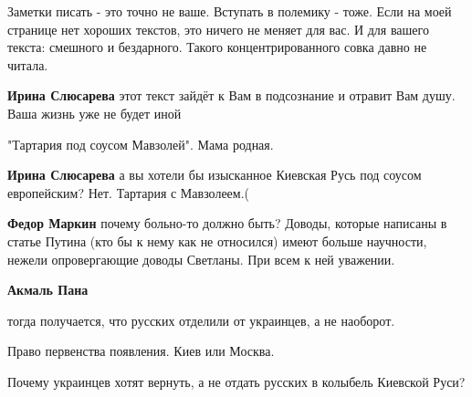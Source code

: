 \begin{itemize}
\begin{itemize}
Заметки писать - это точно не ваше. Вступать в полемику - тоже. Если на моей
странице нет хороших текстов, это ничего не меняет для вас. И для вашего
текста: смешного и бездарного. Такого концентрированного совка давно не читала.


 
\textbf{Ирина Слюсарева} этот текст зайдёт к Вам в подсознание и отравит Вам душу. Ваша жизнь уже не будет иной

 
"Тартария под соусом Мавзолей". Мама родная.

 
\textbf{Ирина Слюсарева} а вы хотели бы изысканное Киевская Русь под соусом европейским?
Нет. Тартария с Мавзолеем.(

 
\textbf{Федор Маркин} почему больно-то должно быть? Доводы, которые написаны в статье Путина (кто бы к нему как не относился) имеют больше научности, нежели опровергающие доводы Светланы. При всем к ней уважении.

 
\textbf{Акмаль Пана} 

тогда получается, что русских отделили от украинцев, а не наоборот.

Право первенства появления. Киев или Москва.

Почему украинцев хотят вернуть, а не отдать русских в колыбель Киевской Руси?



\end{itemize}
\end{itemize}
